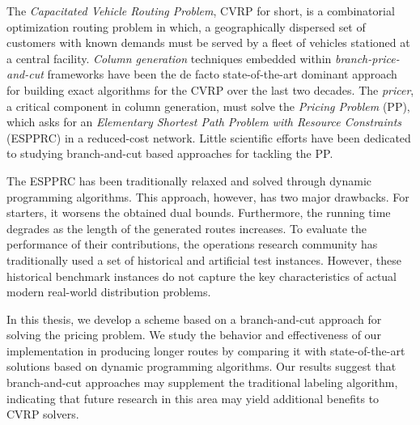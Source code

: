 \noindent The \textit{Capacitated Vehicle Routing Problem}, CVRP for short,
is a combinatorial optimization routing problem in which,
a geographically dispersed set of customers with known demands
must be served by a fleet of vehicles stationed at a central facility.
\textit{Column generation} techniques embedded within \textit{branch-price-and-cut} frameworks
have been the de facto state-of-the-art dominant approach
for building exact algorithms for the CVRP over the last two decades.
The \textit{pricer}, a critical component in column generation, must solve
the \textit{Pricing Problem} (PP), which asks for an
\textit{Elementary Shortest Path Problem with Resource Constraints} (ESPPRC)
in a reduced-cost network.
Little scientific efforts have been dedicated to studying
branch-and-cut based approaches for tackling the PP.

The ESPPRC has been traditionally relaxed and solved through dynamic programming algorithms.
This approach, however, has two major drawbacks.
For starters, it worsens the obtained dual bounds.
Furthermore, the running time degrades as the length of the generated routes increases.
To evaluate the performance of their contributions, the operations research community has traditionally used a set of historical and artificial test instances.
However, these historical benchmark instances do not capture the key characteristics of actual modern real-world distribution problems.

\noindent In this thesis, we develop
a scheme based on a branch-and-cut approach for solving the pricing problem.
We study the behavior and effectiveness of our implementation in producing longer routes by comparing it with state-of-the-art solutions based on dynamic programming algorithms.
Our results suggest that branch-and-cut approaches may supplement the traditional labeling algorithm, indicating that future research in this area may yield additional benefits to CVRP solvers.
